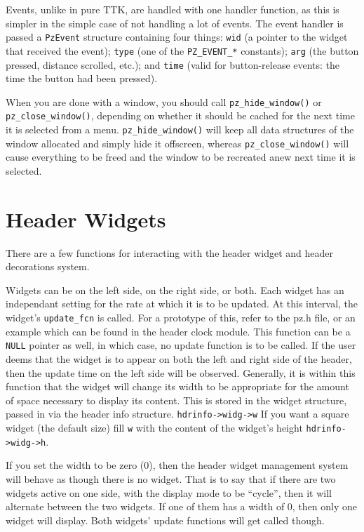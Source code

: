 \documentclass[12pt,letterpaper]{report}
\begin{document}
Events, unlike in pure TTK, are handled with one handler function, as this is simpler in
the simple case of not handling a lot of events. The event handler is passed a \verb|PzEvent|
structure containing four things: \verb|wid| (a pointer to the widget that received the event);
\verb|type| (one of the \verb|PZ_EVENT_*| constants); \verb|arg| (the button pressed, distance
scrolled, etc.); and \verb|time| (valid for button-release events: the time the button had been
pressed).

When you are done with a window, you should call \verb|pz_hide_window()| or \verb|pz_close_window()|,
depending on whether it should be cached for the next time it is selected from a menu.
\verb|pz_hide_window()| will keep all data structures of the window allocated and simply hide
it offscreen, whereas \verb|pz_close_window()| will cause everything to be freed and the window
to be recreated anew next time it is selected.

\section{Header Widgets}

There are a few functions for interacting with the header widget
and header decorations system.

Widgets can be on the left side, on the right side, or both.  Each
widget has an independant setting for the rate at which 
it is to be updated.  At this interval, the widget's \verb|update_fcn|
is called.  For a prototype of this, refer to the pz.h file, or an
example which can be found in the header clock module.  This function
can be a \verb|NULL| pointer as well, in which case, no update
function is to be called.  If the user deems that the widget is to
appear on both the left and right side of the header, then the
update time on the left side will be observed.  Generally, it is
within this function that the widget will change its width to be
appropriate for the amount of space necessary to display its content.
This is stored in the widget structure, passed in via the header
info structure.  \verb|hdrinfo->widg->w| If you want a square widget
(the default size) fill \verb|w| with the content of the widget's
height \verb|hdrinfo->widg->h|.

If you set the width to be zero (0), then the header widget management
system will behave as though there is no widget.  That is to say
that if there are two widgets active on one side, with the display
mode to be ``cycle'', then it will alternate between the two widgets.
If one of them has a width of 0, then only one widget will display.
Both widgets' update functions will get called though.
\end{document}

